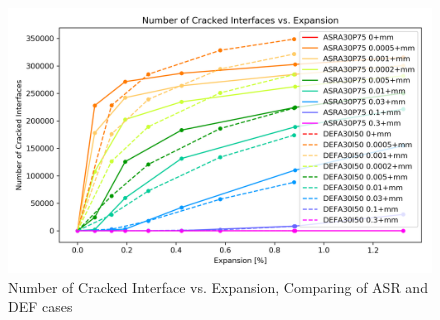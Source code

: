 \begin{figure}[ht!]
\centering
\includegraphics[width=.8\linewidth]{Files/exp_3D/Compare.png}
  \caption{Number of Cracked Interface vs. Expansion, Comparing of ASR and DEF cases}
  \label{Compare}
\end{figure}
